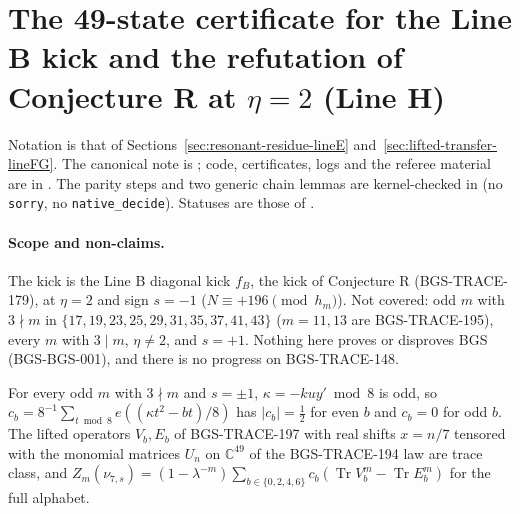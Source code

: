 \section{The 49-state certificate for the Line B kick and the refutation of Conjecture R at \texorpdfstring{\(\eta=2\)}{eta = 2} (Line H)}
\label{sec:lineH-49state}
Notation is that of Sections~\ref{sec:resonant-residue-lineE} and~\ref{sec:lifted-transfer-lineFG}. The canonical note is ; code, certificates, logs and the referee material are in . The parity steps and two generic chain lemmas are kernel-checked in  (no \texttt{sorry}, no \texttt{native\_decide}). Statuses are those of .

\paragraph{Scope and non-claims.} The kick is the Line B diagonal kick \(f_B\), the kick of Conjecture R (BGS-TRACE-179), at \(\eta=2\) and sign \(s=-1\) (\(N\equiv+196\pmod{h_m}\)). Not covered: odd \(m\) with \(3\nmid m\) in \(\{17,19,23,25,29,31,35,37,41,43\}\) (\(m=11,13\) are BGS-TRACE-195), every \(m\) with \(3\mid m\), \(\eta\ne2\), and \(s=+1\). Nothing here proves or disproves BGS (BGS-BGS-001), and there is no progress on BGS-TRACE-148.

\begin{theorem}
For every odd \(m\) with \(3\nmid m\) and \(s=\pm1\), \(\kappa=-k u y'\bmod 8\) is odd, so \(c_b=8^{-1}\sum_{t\bmod 8}e((\kappa t^2-bt)/8)\) has \(\lvert c_b\rvert=\tfrac12\) for even \(b\) and \(c_b=0\) for odd \(b\). The lifted operators \(V_b,E_b\) of BGS-TRACE-197 with real shifts \(x=n/7\) tensored with the monomial matrices \(U_n\) on \(\mathbb C^{49}\) of the BGS-TRACE-194 law are trace class, and \(Z_m(\nu_{7,s})=(1-\lambda^{-m})\sum_{b\in\{0,2,4,6\}}c_b(\operatorname{Tr}V_b^m-\operatorname{Tr}E_b^m)\) for the full alphabet.
\end{theorem}

